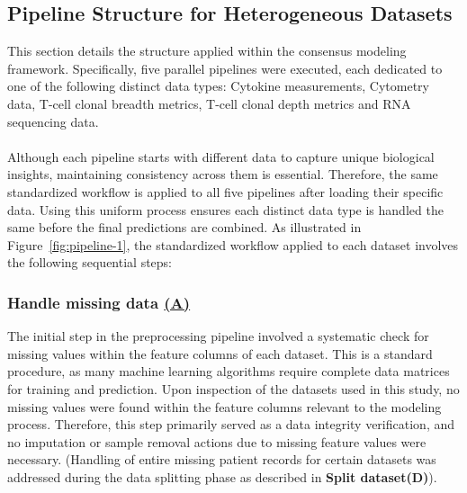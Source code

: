 \documentclass[12pt,a4paper]{report}
\begin{document}
\subsection{Pipeline Structure for Heterogeneous Datasets}
\noindent
This section details the structure applied within the consensus modeling framework. Specifically, five parallel pipelines were executed, each dedicated to one of the following distinct data types:
Cytokine measurements, Cytometry data, T-cell clonal breadth metrics, T-cell clonal depth metrics and RNA sequencing data.\\
\\
Although each pipeline starts with different data to capture unique biological insights, maintaining consistency across them is essential. Therefore, the same standardized workflow is applied to all five pipelines after loading their specific data. Using this uniform process ensures each distinct data type is handled the same before the final predictions are combined. As illustrated in Figure~\ref{fig:pipeline-1}, the standardized workflow applied to each dataset involves the following sequential steps:

\subsubsection*{Handle missing data \hyperref[fig:pipeline-1]{(A)}}
The initial step in the preprocessing pipeline involved a systematic check for missing values within the feature columns of each dataset. This is a standard procedure, as many machine learning algorithms require complete data matrices for training and prediction. Upon inspection of the datasets used in this study, no missing values were found within the feature columns relevant to the modeling process. Therefore, this step primarily served as a data integrity verification, and no imputation or sample removal actions due to missing feature values were necessary. (Handling of entire missing patient records for certain datasets was addressed during the data splitting phase as described in \textbf{{Split dataset(D)}}).
\end{document}
